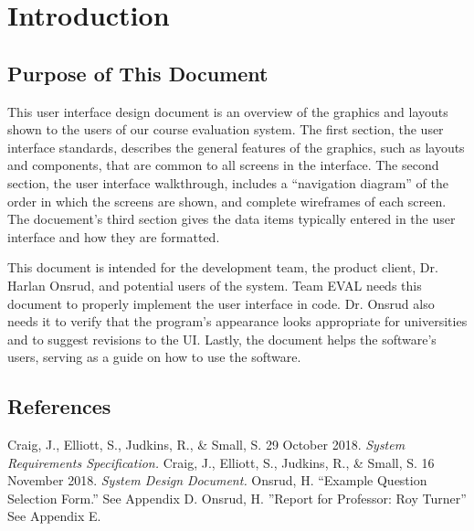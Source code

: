 \documentclass{article}
\begin{document}
\tableofcontents

\newpage

\section{Introduction}
 

\subsection{Purpose of This Document}

This user interface design document is an overview of the graphics and layouts shown to the users of our course evaluation system. The first section, the user interface standards, describes the general features of the graphics, such as layouts and components, that are common to all screens in the interface. The second section, the user interface walkthrough, includes a ``navigation diagram'' of the order in which the screens are shown, and complete wireframes of each screen. The docuement's third section gives the data items typically entered in the user interface and how they are formatted.

This document is intended for the development team, the product client, Dr. Harlan Onsrud, and potential users of the system. Team EVAL needs this document to properly implement the user interface in code. Dr. Onsrud also needs it to verify that the program's appearance looks appropriate for universities and to suggest revisions to the UI. Lastly, the document helps the software's users, serving as a guide on how to use the software.


\subsection{References}

Craig, J., Elliott, S., Judkins, R., \& Small, S. 29 October 2018. \textit{System Requirements Specification.}
\vspace{3mm}\newline
Craig, J., Elliott, S., Judkins, R., \& Small, S. 16 November 2018. \textit{System Design Document.}
\vspace{3mm}\newline
Onsrud, H. ``Example Question Selection Form.'' See Appendix D.
\vspace{3mm}\newline
Onsrud, H. ''Report for Professor: Roy Turner'' See Appendix E.
\end{document}
